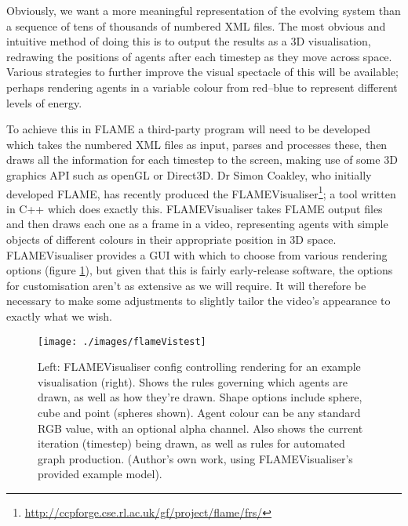 \documentclass[11pt,a4paper]{article}
\begin{document}
Obviously, we want a more meaningful representation of the evolving system than a sequence of tens of thousands of numbered XML files. The most obvious and intuitive method of doing this is to output the results as a 3D visualisation, redrawing the positions of agents after each timestep as they move across space. Various strategies to further improve the visual spectacle of this will be available; perhaps rendering agents in a variable colour from red--blue to represent different levels of energy. 

To achieve this in FLAME a third-party program will need to be developed which takes the numbered XML files as input, parses and processes these, then draws all the information for each timestep to the screen, making use of some 3D graphics API such as openGL or Direct3D. Dr Simon Coakley, who initially developed FLAME, has recently produced the FLAMEVisualiser\footnote{\url{http://ccpforge.cse.rl.ac.uk/gf/project/flame/frs/}}; a tool written in C++ which does exactly this. FLAMEVisualiser takes FLAME output files and then draws each one as a frame in a video, representing agents with simple objects of different colours in their appropriate position in 3D space. FLAMEVisualiser provides a GUI with which to choose from various rendering options (figure \ref{visualiserConfig}), but given that this is fairly early-release software, the options for customisation aren't as extensive as we will require. It will therefore be necessary to make some adjustments to slightly tailor the video's appearance to exactly what we wish.

\begin{figure}[H]
\centering
\texttt{[image: ./images/flameVistest]}
\caption[FLAMEVisualiser config and an example rendering]{Left: FLAMEVisualiser config controlling rendering for an example visualisation (right). Shows the rules governing which agents are drawn, as well as how they're drawn. Shape options include sphere, cube and point (spheres shown). Agent colour can be any standard RGB value, with an optional alpha channel. Also shows the current iteration (timestep) being drawn, as well as rules for automated graph production. (Author's own work, using FLAMEVisualiser's provided example model).}
\label{visualiserConfig}
\end{figure}
\end{document}
